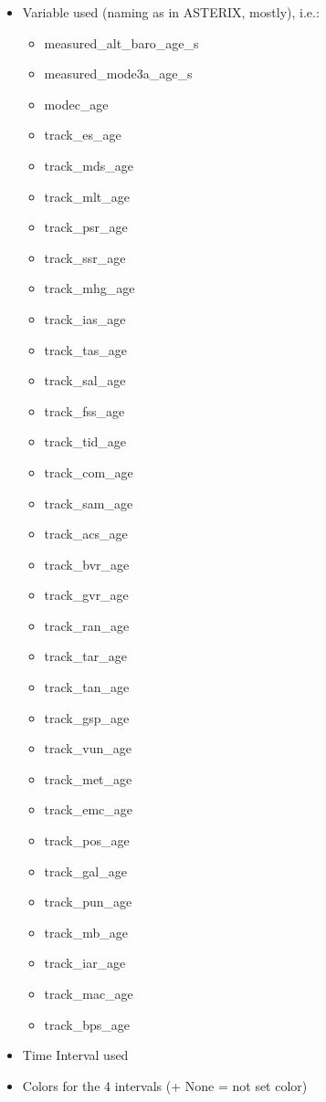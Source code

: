 \begin{itemize}
 \item Variable used (naming as in ASTERIX, mostly), i.e.:
 \begin{itemize}
    \item measured\_alt\_baro\_age\_s
    \item measured\_mode3a\_age\_s
    \item modec\_age
    \item track\_es\_age
    \item track\_mds\_age
    \item track\_mlt\_age
    \item track\_psr\_age
    \item track\_ssr\_age
    \item track\_mhg\_age
    \item track\_ias\_age
    \item track\_tas\_age
    \item track\_sal\_age
    \item track\_fss\_age
    \item track\_tid\_age
    \item track\_com\_age
    \item track\_sam\_age
    \item track\_acs\_age
    \item track\_bvr\_age
    \item track\_gvr\_age
    \item track\_ran\_age
    \item track\_tar\_age
    \item track\_tan\_age
    \item track\_gsp\_age
    \item track\_vun\_age
    \item track\_met\_age
    \item track\_emc\_age
    \item track\_pos\_age
    \item track\_gal\_age
    \item track\_pun\_age
    \item track\_mb\_age
    \item track\_iar\_age
    \item track\_mac\_age
    \item track\_bps\_age
 \end{itemize}
 \item Time Interval used
 \item Colors for the 4 intervals (+ None = not set color)
\end{itemize}

